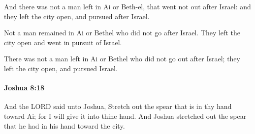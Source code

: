 			\begin{versebox}
					\item[BHS] 
					\item[ASV] And there was not a man left in Ai or Beth-el, that went not out after Israel: and they left the city open, and pursued after Israel.
					\item[NIV] Not a man remained in Ai or Bethel who did not go after Israel. They left the city open and went in pursuit of Israel.
					\item[NRSV] There was not a man left in Ai or Bethel who did not go out after Israel; they left the city open, and pursued Israel.
			\end{versebox}

		\paragraph{Joshua 8:18} %
			\label{JOSHUA-8-18}

			And the LORD said unto Joshua, Stretch out the spear that is in thy hand toward Ai; for I will give it into thine hand. And Joshua stretched out the spear that he had in his hand toward the city.

